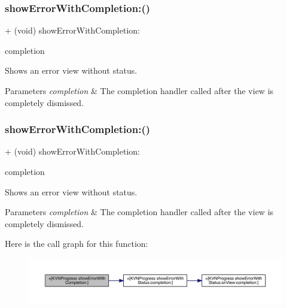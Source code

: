 \subsubsection{\texorpdfstring{show\+Error\+With\+Completion\+:()}{showErrorWithCompletion:()}\hspace{0.1cm}{\footnotesize\ttfamily [1/3]}}
{\footnotesize\ttfamily + (void) show\+Error\+With\+Completion\+: \begin{DoxyParamCaption}\item[{(K\+V\+N\+Completion\+Block)}]{completion }\end{DoxyParamCaption}}

Shows an error view without status. 
\begin{DoxyParams}{Parameters}
{\em completion} & The completion handler called after the view is completely dismissed. \\
\hline
\end{DoxyParams}
\mbox{\label{interface_k_v_n_progress_a9de6833483cb5bd061d150e8fb42e5f8}} 
\subsubsection{\texorpdfstring{show\+Error\+With\+Completion\+:()}{showErrorWithCompletion:()}\hspace{0.1cm}{\footnotesize\ttfamily [2/3]}}
{\footnotesize\ttfamily + (void) show\+Error\+With\+Completion\+: \begin{DoxyParamCaption}\item[{(K\+V\+N\+Completion\+Block)}]{completion }\end{DoxyParamCaption}}

Shows an error view without status. 
\begin{DoxyParams}{Parameters}
{\em completion} & The completion handler called after the view is completely dismissed. \\
\hline
\end{DoxyParams}
Here is the call graph for this function\+:\nopagebreak
\begin{figure}[H]
\begin{center}
\leavevmode
\includegraphics[width=350pt]{interface_k_v_n_progress_a9de6833483cb5bd061d150e8fb42e5f8_cgraph}
\end{center}
\end{figure}
\mbox{\label{interface_k_v_n_progress_a9de6833483cb5bd061d150e8fb42e5f8}} 
